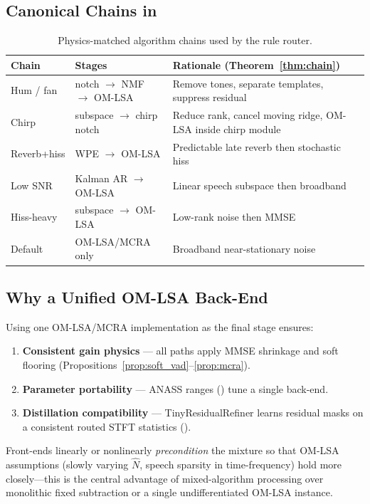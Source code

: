 \subsection{Canonical Chains in \projectshort{}}

\begin{table}[H]
  \centering
  \caption{Physics-matched algorithm chains used by the rule router.}
  \label{tab:chains}
  \begin{tabular}{lll}
    \toprule
    \textbf{Chain} & \textbf{Stages} & \textbf{Rationale (Theorem~\ref{thm:chain})} \\
    \midrule
    Hum / fan   & notch $\rightarrow$ NMF $\rightarrow$ OM-LSA & Remove tones, separate templates, suppress residual \\
    Chirp       & subspace $\rightarrow$ chirp notch & Reduce rank, cancel moving ridge, OM-LSA inside chirp module \\
    Reverb+hiss & WPE $\rightarrow$ OM-LSA & Predictable late reverb then stochastic hiss \\
    Low SNR     & Kalman AR $\rightarrow$ OM-LSA & Linear speech subspace then broadband \\
    Hiss-heavy  & subspace $\rightarrow$ OM-LSA & Low-rank noise then MMSE \\
    Default     & OM-LSA/MCRA only & Broadband near-stationary noise \\
    \bottomrule
  \end{tabular}
\end{table}

\subsection{Why a Unified OM-LSA Back-End}

Using one OM-LSA/MCRA implementation as the final stage ensures:
\begin{enumerate}
  \item \textbf{Consistent gain physics} --- all paths apply MMSE shrinkage and soft flooring (Propositions~\ref{prop:soft_vad}--\ref{prop:mcra}).
  \item \textbf{Parameter portability} --- ANASS ranges () tune a single back-end.
  \item \textbf{Distillation compatibility} --- TinyResidualRefiner learns residual masks on a consistent routed STFT statistics ().
\end{enumerate}

Front-ends linearly or nonlinearly \emph{precondition} the mixture so that OM-LSA assumptions (slowly varying $\hat{N}$, speech sparsity in time-frequency) hold more closely---this is the central advantage of mixed-algorithm processing over monolithic fixed subtraction or a single undifferentiated OM-LSA instance.

